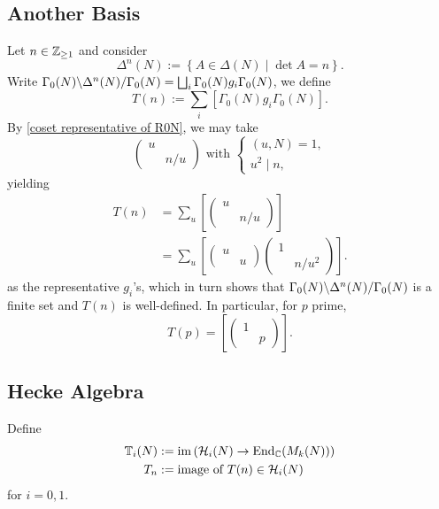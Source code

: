 \subsection{Another Basis}
\begin{definition}
    [operator $T(n)$]
    Let $n\in\Z_{\ge 1}$ and consider \[\Delta^n(N) := \left\{ A\in\Delta(N)\mid \det A = n \right\}.\]
    Write $\bico{\Delta^n(N )}{\Gamma_0(N)}{\Gamma_0(N)} = \bigsqcup_{i} \Gamma_0(N)g_i\Gamma_0(N)$, we define \[T(n) := \sum_{i} [\Gamma_0(N)g_i\Gamma_0(N)].\]
    By \cref{coset representative of R0N}, we may take \[\begin{pmatrix}
        u & \\ & n/u
    \end{pmatrix}\text{  with }\begin{cases}
        (u, N) = 1,\\ u^2\mid n,
    \end{cases}\]yielding\begin{align*}
        T(n) &= \sum_{u} \left[ \begin{pmatrix}
            u & \\ & n/u
        \end{pmatrix} \right]\\ 
        &=\sum_{u} \left[ \begin{pmatrix}
            u & \\ & u
        \end{pmatrix}\begin{pmatrix}
            1 & \\ & n/u^2
        \end{pmatrix} \right].
    \end{align*}
    as the representative $g_i$'s, which in turn shows that $\bico{\Delta^n(N )}{\Gamma_0(N)}{\Gamma_0(N)}$ is a finite set and $T(n)$ is well-defined.
    In particular, for $p$ prime, \[T(p) = \left[ \begin{pmatrix}
        1&\\ &p
    \end{pmatrix} \right].\]
\end{definition}

\subsection{Hecke Algebra}
Define \begin{align}
    \mathbb{T}_i(N) &:= \im \left( \hecke_i(N)\to \enom_{\C} (M_k(N))\right)\\
    T_n &:= \text{image of } T(n)\in\hecke_i(N)
 \end{align}
for $i = 0, 1$.





